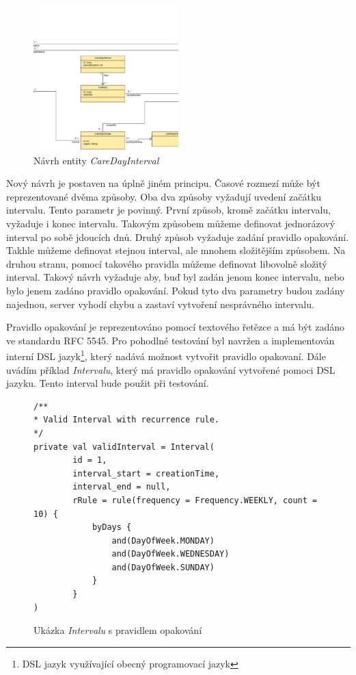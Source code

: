         \begin{figure}\centering
	        \includegraphics[width=0.5\textwidth]{pdfs/CareDayInterval}
	        \caption[Návrh intervalu]{Návrh entity \textit{CareDayInterval}}\label{image:careDayInterval}
        \end{figure}
    
        Nový návrh je postaven na úplně jiném principu. Časové rozmezí může být reprezentované dvěma způsoby. Oba dva způsoby vyžadují uvedení začátku intervalu. Tento parametr je povinný. První způsob, kromě začátku intervalu, vyžaduje i konec intervalu. Takovým způsobem můžeme definovat jednorázový interval po sobě jdoucích dnů. Druhý způsob vyžaduje zadání pravidlo opakování. Takhle můžeme definovat stejnou interval, ale mnohem složitějším způsobem. Na druhou stranu, pomocí takového pravidla můžeme definovat libovolně složitý interval. Takový návrh vyžaduje aby, buď byl zadán jenom konec intervalu, nebo bylo jenem zadáno pravidlo opakování. Pokud tyto dva parametry budou zadány najednou, server vyhodí chybu a zastaví vytvoření nesprávného intervalu.
    
        Pravidlo opakování je reprezentováno pomocí textového řetězce a má být zadáno ve standardu {RFC 5545}\cite{recurrence-rule}. Pro pohodlné testování byl navržen a implementován {interní DSL jazyk}\footnote{DSL jazyk využívající obecný programovací jazyk}, který nadává možnost vytvořit pravidlo opakovaní. Dále uvádím příklad \textit{Intervalu}, který má pravidlo opakování vytvořené pomoci DSL jazyku. Tento interval bude použit při testování.
        \begin{figure}
            \begin{verbatim}
/**
* Valid Interval with recurrence rule.
*/
private val validInterval = Interval(
        id = 1,
        interval_start = creationTime,
        interval_end = null,
        rRule = rule(frequency = Frequency.WEEKLY, count = 10) {
            byDays {
                and(DayOfWeek.MONDAY)
                and(DayOfWeek.WEDNESDAY)
                and(DayOfWeek.SUNDAY)
            }
        }
)
            \end{verbatim}
            \caption{Ukázka \textit{Intervalu} s pravidlem opakování} 
            \label{code:valid-interval}
        \end{figure}
